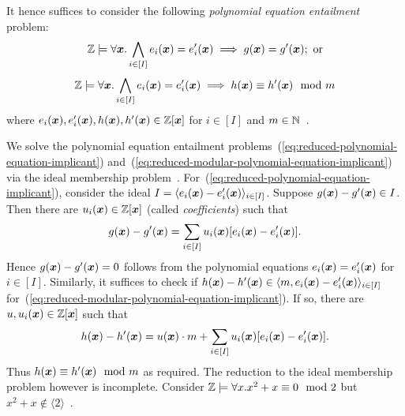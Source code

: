 It hence suffices to consider the following
\emph{polynomial equation entailment} problem:
\begin{equation}
  \label{eq:reduced-polynomial-equation-implicant}
  \bbfZ \models \forall \vx. %
  \bigwedge\limits_{i \in [I]} e_i (\vx) = e'_i (\vx)
  \implies
  g (\vx) = g' (\vx); \textmd{ or}
\end{equation}
 \begin{equation}
   \label{eq:reduced-modular-polynomial-equation-implicant}
   \bbfZ \models \forall \vx. %
   \bigwedge\limits_{i \in [I]} e_i (\vx) = e'_i (\vx)
   \implies
   h (\vx) \equiv h' (\vx) \mod m
 \end{equation}
 where $e_i (\vx), e'_i (\vx), h (\vx), h' (\vx) \in \bbfZ[\vx]$ for $i
\in [I]$ and $m \in \mathbb{N}$~\cite{H:07:AENTP}.

We solve the polynomial equation entailment
problems~(\ref{eq:reduced-polynomial-equation-implicant}) 
and~(\ref{eq:reduced-modular-polynomial-equation-implicant}) via
the ideal membership problem~\cite{H:07:AENTP,BS:16:GFEV}. 
For~(\ref{eq:reduced-polynomial-equation-implicant}), consider the
ideal $I = \langle e_i(\vx) - e'_i(\vx) \rangle_{i \in [I]}$. Suppose
$g(\vx) - g'(\vx) \in I$. Then there are $u_i(\vx) \in \bbfZ[\vx]$
(called \emph{coefficients}) such that 
\begin{equation}
  \label{eq:reduced-polynomial-equation-witnesses}
  g(\vx) - g'(\vx) = \sum\limits_{i \in [I]} u_i (\vx) [e_i (\vx) - e'_i (\vx)].
\end{equation}
Hence $g(\vx) - g'(\vx) = 0$ follows from  the polynomial equations
$e_i (\vx) = e'_i (\vx)$ for $i \in [I]$. Similarly, it
suffices to check if $h(\vx) - h'(\vx) \in \langle m, e_i(\vx) -
e'_i(\vx) \rangle_{i \in [I]}$
for~(\ref{eq:reduced-modular-polynomial-equation-implicant}).
If so, there are $u, u_i(\vx) \in \bbfZ[\vx]$ such that
\begin{equation}
  \label{eq:reduced-modular-polynomial-equation-witnesses}
  h(\vx) - h'(\vx) = u(\vx) \cdot m + \sum\limits_{i \in [I]} u_i (\vx)
  [e_i (\vx) - e'_i (\vx)]. 
\end{equation}
Thus $h(\vx) \equiv h'(\vx) \mod m$ as required.
The reduction to the ideal membership problem however is 
incomplete. Consider $\mathbb{Z} \models \forall x. x^2 + x
\equiv 0 \mod 2$ but $x^2 + x \not\in \langle 2
\rangle$~\cite{H:07:AENTP}. 

